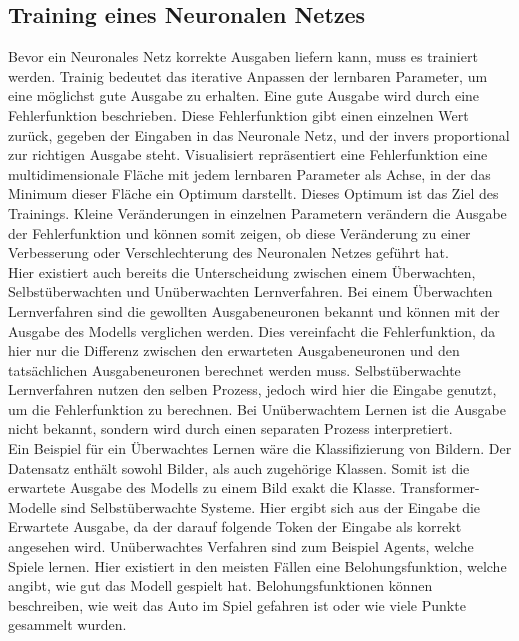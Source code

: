 \subsection{Training eines Neuronalen Netzes}
Bevor ein Neuronales Netz korrekte Ausgaben liefern kann, muss es trainiert werden.
Trainig bedeutet das iterative Anpassen der lernbaren Parameter, um eine möglichst gute Ausgabe zu erhalten.
Eine gute Ausgabe wird durch eine Fehlerfunktion beschrieben. Diese Fehlerfunktion gibt einen einzelnen Wert zurück, gegeben der Eingaben in das Neuronale Netz, und der invers proportional zur richtigen Ausgabe steht. Visualisiert repräsentiert eine Fehlerfunktion eine multidimensionale Fläche mit jedem lernbaren Parameter als Achse, in der das Minimum dieser Fläche ein Optimum darstellt.
Dieses Optimum ist das Ziel des Trainings. Kleine Veränderungen in einzelnen Parametern verändern die Ausgabe der Fehlerfunktion und können somit zeigen, ob diese Veränderung zu einer Verbesserung oder Verschlechterung des Neuronalen Netzes geführt hat.\\

Hier existiert auch bereits die Unterscheidung zwischen einem Überwachten, Selbstüberwachten und Unüberwachten Lernverfahren.
Bei einem Überwachten Lernverfahren sind die gewollten Ausgabeneuronen bekannt und können mit der Ausgabe des Modells verglichen werden.
Dies vereinfacht die Fehlerfunktion, da hier nur die Differenz zwischen den erwarteten Ausgabeneuronen und den tatsächlichen Ausgabeneuronen berechnet werden muss.
Selbstüberwachte Lernverfahren nutzen den selben Prozess, jedoch wird hier die Eingabe genutzt, um die Fehlerfunktion zu berechnen.
Bei Unüberwachtem Lernen ist die Ausgabe nicht bekannt, sondern wird durch einen separaten Prozess interpretiert.\\

Ein Beispiel für ein Überwachtes Lernen wäre die Klassifizierung von Bildern.
Der Datensatz enthält sowohl Bilder, als auch zugehörige Klassen.
Somit ist die erwartete Ausgabe des Modells zu einem Bild exakt die Klasse.
Transformer-Modelle sind Selbstüberwachte Systeme.
Hier ergibt sich aus der Eingabe die Erwartete Ausgabe, da der darauf folgende Token der Eingabe als korrekt angesehen wird.
Unüberwachtes Verfahren sind zum Beispiel Agents, welche Spiele lernen.
Hier existiert in den meisten Fällen eine Belohungsfunktion, welche angibt, wie gut das Modell gespielt hat.
Belohungsfunktionen können beschreiben, wie weit das Auto im Spiel gefahren ist oder wie viele Punkte gesammelt wurden.\\

